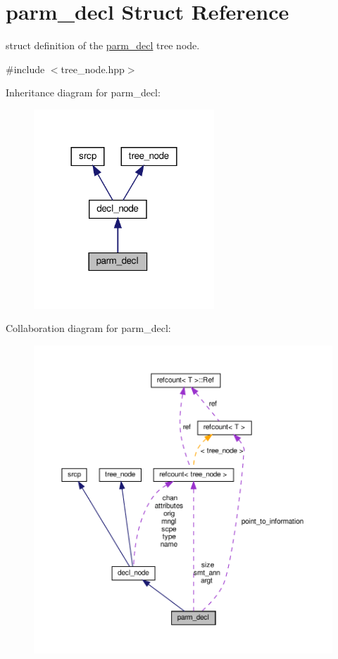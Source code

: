 \hypertarget{structparm__decl}{}\section{parm\+\_\+decl Struct Reference}
\label{structparm__decl}


struct definition of the \hyperlink{structparm__decl}{parm\+\_\+decl} tree node.  




{\ttfamily \#include $<$tree\+\_\+node.\+hpp$>$}



Inheritance diagram for parm\+\_\+decl\+:
\nopagebreak
\begin{figure}[H]
\begin{center}
\leavevmode
\includegraphics[width=192pt]{df/d57/structparm__decl__inherit__graph}
\end{center}
\end{figure}


Collaboration diagram for parm\+\_\+decl\+:
\nopagebreak
\begin{figure}[H]
\begin{center}
\leavevmode
\includegraphics[width=350pt]{df/d26/structparm__decl__coll__graph}
\end{center}
\end{figure}
